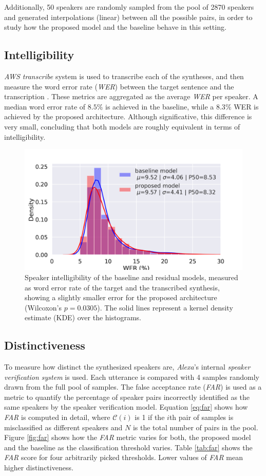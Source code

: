  Additionally, 50 speakers are randomly sampled from the pool of 2870 speakers and generated interpolations (linear) between all the possible pairs, in order to study how the proposed model and the baseline behave in this setting.

 \subsection{Intelligibility}
\textit{AWS transcribe} system is used to transcribe each of the syntheses, and then measure the word error rate (\textit{WER}) between the target sentence and the transcription \autocite{uday2019}. These metrics are aggregated as the average \textit{WER} per speaker. A median word error rate of $8.5\%$ is achieved in the baseline, while a $8.3\%$ WER is achieved by the proposed architecture. Although significative, this difference is very small, concluding that both models are roughly equivalent in terms of intelligibility.


\begin{figure}[h]
	\centering
	\includegraphics[width=0.7\linewidth]{tts/images/wer}
	\caption[Speaker intelligibility curves for the TTS models]{Speaker intelligibility of the baseline and residual models, measured as word error rate of the target and the transcribed synthesis, showing a slightly smaller error for the proposed architecture (Wilcoxon's $p=0.0305$). The solid lines represent a kernel density estimate (KDE) over the histograms.}
	\label{fig:wer}
\end{figure}


\subsection{Distinctiveness}
To measure how distinct the synthesized speakers are, \textit{Alexa}'s internal \textit{speaker verification system} is used.  Each utterance is compared with 4 samples randomly drawn from the full pool of samples. The false acceptance rate (\textit{FAR}) is used as a metric to quantify the percentage of speaker pairs incorrectly identified as the same speakers by the speaker verification model. Equation \ref{eq:far} shows how \textit{FAR} is computed in detail, where $\mathcal{C}(i)$ is 1 if the $i$th pair of samples is misclassified as different speakers and $N$ is the total number of pairs in the pool. Figure \ref{fig:far} shows how the \textit{FAR} metric varies for both, the proposed model and the baseline as the classification threshold varies. Table \ref{tab:far} shows the \textit{FAR} score for four arbitrarily picked thresholds. Lower values of \textit{FAR} mean higher distinctiveness.

